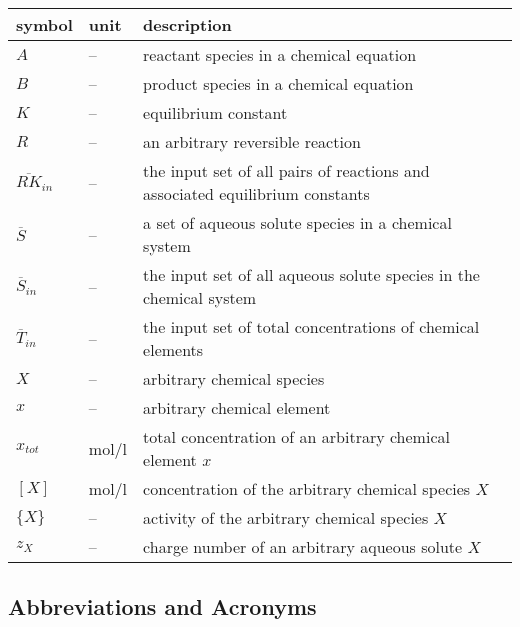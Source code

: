 \documentclass[12pt]{article}
\begin{document}
\renewcommand{\arraystretch}{1.2}
\noindent \begin{longtable*}{l l p{12cm}} \toprule
\textbf{symbol} & \textbf{unit} & \textbf{description}\\
\midrule 
$A$ & -- & reactant species in a chemical equation
\\
$B$ & -- & product species in a chemical equation
\\ 
$K$ & -- & equilibrium constant
\\ 
$R$ & -- & an arbitrary reversible reaction
\\ 
$\overline {RK}_{in}$ & -- & the input set of all pairs of reactions and associated equilibrium constants 
\\ 
$\overline S$ & -- & a set of aqueous solute species in a chemical system
\\ 
$\overline S_{in}$ & -- & the input set of all aqueous solute species in the chemical system
\\ 
$\overline T_{in}$ & -- & the input set of total concentrations of chemical elements
\\ 
$X$ & -- & arbitrary chemical species
\\
$x$ & -- & arbitrary chemical element
\\
$x_{tot}$ & \si[per-mode=symbol] {\mole\per\litre} & total concentration of an arbitrary chemical element $x$
\\
$[X]$ & \si[per-mode=symbol] {\mole\per\litre} & concentration of the arbitrary chemical species $X$
\\
$\{X\}$ & -- & activity of the arbitrary chemical species $X$
\\
$z_{X}$ & -- & charge number of an arbitrary aqueous solute $X$
\\
\bottomrule
\end{longtable*}


\subsection{Abbreviations and Acronyms}
\end{document}
